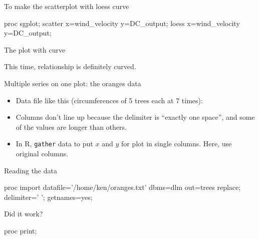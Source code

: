 \documentclass[unknownkeysallowed]{beamer}\usepackage[]{graphicx}\usepackage[]{color}
\begin{document}
\begin{frame}[fragile]{To make the scatterplot with loess curve}
  
\begin{Sascode}[store=mje]
proc sgplot;
  scatter x=wind_velocity y=DC_output;
  loess x=wind_velocity y=DC_output;
\end{Sascode}
  
  
\end{frame}

\begin{frame}[fragile]{The plot with curve}
  
  
  This time, relationship is definitely curved.
  
\end{frame}


\begin{frame}[fragile]{Multiple series on one plot: the oranges data}

  \begin{itemize}
  \item Data file like this (circumferences of 5 trees each at 7
    times):
    


\item Columns don't line up because the delimiter is ``exactly one
  space'', and some of the values are longer than others.
\item In R, \texttt{gather} data to  put $x$ and $y$ for plot in
  single columns. Here, use original columns.
  \end{itemize}
  
\end{frame}

\begin{frame}[fragile]{Reading the data}
  
    \begin{Datastep}
proc import
  datafile='/home/ken/oranges.txt'
    dbms=dlm
    out=trees
    replace;
  delimiter=' ';
  getnames=yes;
    \end{Datastep}

  
\end{frame}

\begin{frame}[fragile]{Did it work?}
  
  \begin{Sascode}[store=ora]
proc print;    
  \end{Sascode}
  
  
\end{frame}
\end{document}

